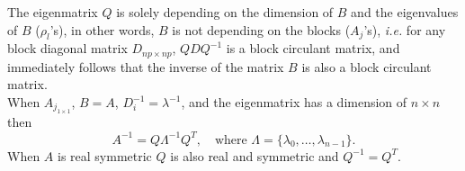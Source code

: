 The eigenmatrix $Q$ is solely depending on the dimension of $B$ and the eigenvalues of $B$ ($\rho_l$'s), in other words, $B$ is not depending on the blocks ($A_j$'s), {\em i.e.} for any block diagonal matrix $D_{np \times np}$, $QDQ^{-1}$ is a block circulant matrix, and immediately follows that the inverse of the matrix $B$ is also a block circulant matrix.\\

When $A_{j_{1\times 1}}$, $B=A$, $D_i^{-1}=\lambda^{-1}$, and the eigenmatrix has a dimension of $n\times n$ then
\[
A^{-1} = Q \Lambda^{-1} Q^T, \quad \mbox{where $\Lambda = \{\lambda_0, \ldots, \lambda_{n-1} \}$}.
\]
When $A$ is real symmetric $Q$ is also real and symmetric and $Q^{-1}=Q^T$.





%
%
%
%			
%			
%			
%			
%			
%			
%			
%			
%			
%			
%			
%			
%
